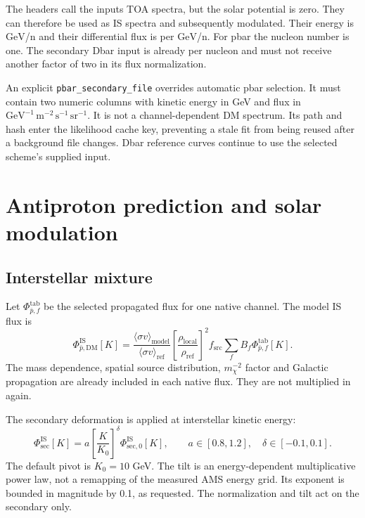 \documentclass[11pt,a4paper]{article}
\newcommand{\sv}{\langle\sigma v\rangle}
\newcommand{\GeV}{\mathrm{GeV}}
\newcommand{\pcbar}{\bar p}
\begin{document}
The headers call the inputs TOA spectra, but the solar potential is zero. They can therefore be used as IS spectra and subsequently modulated. Their energy is $\GeV$/n and their differential flux is per $\GeV$/n. For pbar the nucleon number is one. The secondary Dbar input is already per nucleon and must not receive another factor of two in its flux normalization.

An explicit \texttt{pbar\_secondary\_file} overrides automatic pbar selection. It must contain two numeric columns with kinetic energy in GeV and flux in $\GeV^{-1}\,\mathrm{m}^{-2}\,\mathrm{s}^{-1}\,\mathrm{sr}^{-1}$. It is not a channel-dependent DM spectrum. Its path and hash enter the likelihood cache key, preventing a stale fit from being reused after a background file changes. Dbar reference curves continue to use the selected scheme's supplied input.

\section{Antiproton prediction and solar modulation}
\subsection{Interstellar mixture}
Let $\Phi^{\mathrm{tab}}_{\pcbar,f}$ be the selected propagated flux for one native channel. The model IS flux is
\begin{equation}
\Phi^{\mathrm{IS}}_{\pcbar,\mathrm{DM}}[K]=
\frac{\sv_{\mathrm{model}}}{\sv_{\mathrm{ref}}}
\left[\frac{\rho_{\mathrm{local}}}{\rho_{\mathrm{ref}}}\right]^2
f_{\mathrm{src}}\sum_f B_f\Phi^{\mathrm{tab}}_{\pcbar,f}[K].
\end{equation}
The mass dependence, spatial source distribution, $m_\chi^{-2}$ factor and Galactic propagation are already included in each native flux. They are not multiplied in again.

The secondary deformation is applied at interstellar kinetic energy:
\begin{equation}
\Phi^{\mathrm{IS}}_{\mathrm{sec}}[K]=
a\left[\frac{K}{K_0}\right]^\delta\Phi^{\mathrm{IS}}_{\mathrm{sec},0}[K],
\qquad a\in[0.8,1.2],\quad\delta\in[-0.1,0.1].
\end{equation}
The default pivot is $K_0=10$ GeV. The tilt is an energy-dependent multiplicative power law, not a remapping of the measured AMS energy grid. Its exponent is bounded in magnitude by 0.1, as requested. The normalization and tilt act on the secondary only.
\end{document}
